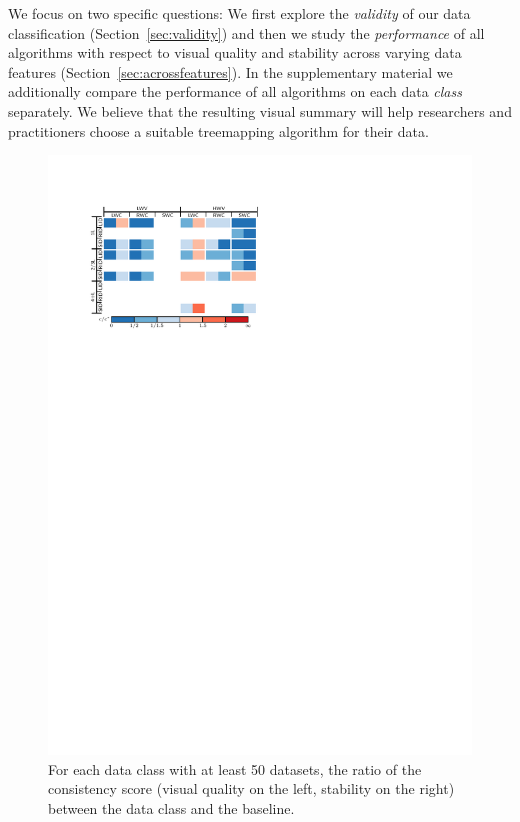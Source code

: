 We focus on two specific questions: We first explore the \emph{validity} of our data classification (Section~\ref{sec:validity}) and then we study the \emph{performance} of all algorithms with respect to visual quality and stability across varying data features (Section~\ref{sec:acrossfeatures}).
In the supplementary material we additionally compare the performance of all algorithms on each data \emph{class} separately. We believe that the resulting visual summary will help researchers and practitioners choose a suitable treemapping algorithm for their data.

\begin{figure}[ht]
    \centering
    \includegraphics[width=.7\textwidth]{figures/treemap-evaluation/VarianceTable}
    \caption{For each data class with at least 50 datasets, the ratio of the consistency score (visual quality on the left, stability on the right) between the data class and the baseline. }
    \label{fig:variancetable}
\end{figure}

